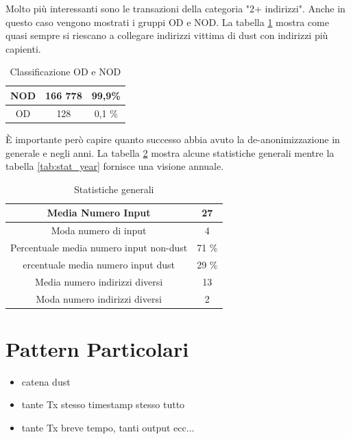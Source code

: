 Molto più interessanti sono le transazioni della categoria "2+ indirizzi". Anche in questo caso vengono mostrati i gruppi OD e NOD. La tabella \ref{tab:OD_NOD_success} mostra come quasi sempre si riescano a collegare indirizzi vittima di dust con indirizzi più capienti.
\begin{table}[H]
    \centering
    \begin{tabular}{|c|c|c|}
        \hline
            NOD  & 166 778 & 99,9\%\\
        \hline 
            OD  & 128 & 0,1 \%\\
        \hline
    \end{tabular}
    \caption{Classificazione OD e NOD}
    \label{tab:OD_NOD_success}
\end{table}
È importante però capire quanto successo abbia avuto la de-anonimizzazione in generale e negli anni. La tabella \ref{tab:stat} mostra alcune statistiche generali mentre la tabella \ref{tab:stat_year} fornisce una visione annuale.
\begin{table}[H]
    \centering
    \begin{tabular}{|c|c|}
        \hline
            Media Numero Input & 27\\
        \hline 
            Moda numero di input & 4\\
        \hline
            Percentuale media numero input non-dust & 71 \%\\
        \hline
            ercentuale media numero input dust & 29 \%\\
        \hline
            Media numero indirizzi diversi & 13\\
        \hline
            Moda numero indirizzi diversi & 2\\
        \hline
    \end{tabular}
    \caption{Statistiche generali}
    \label{tab:stat}
\end{table}
\section{Pattern Particolari}
\begin{itemize}
    \item catena dust
    \item tante Tx stesso timestamp stesso tutto
    \item tante Tx breve tempo, tanti output ecc...
\end{itemize}